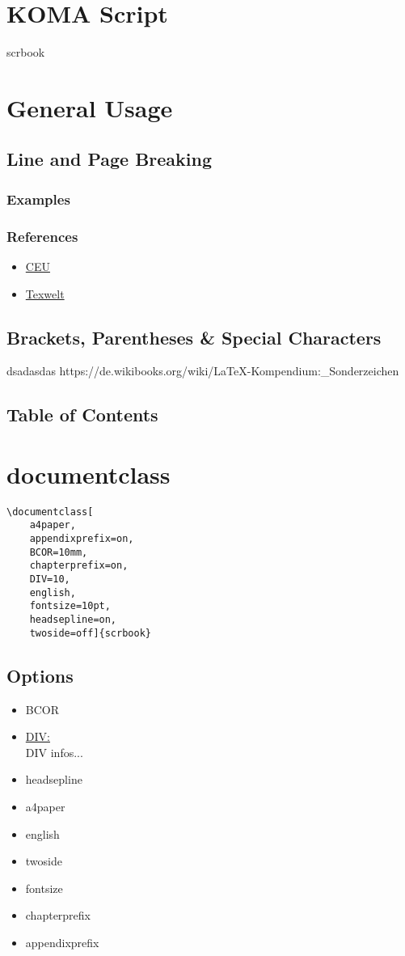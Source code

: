 \section{KOMA Script}
scrbook \autocite{KOH01}
\section{General Usage}
\subsection{Line and Page Breaking}
\subsubsection{Examples}
\subsubsection{References}
\begin{itemize}
    \item{\href{http://www.personal.ceu.hu/tex/breaking.htm} {CEU} \autocite{CEU01}}
    \item{\href{https://texwelt.de/wissen/fragen/4014/was-ist-der-unterschied-zwischen-newline-und-linebreak}{Texwelt}}
\end{itemize}


\subsection{Brackets, Parentheses \& Special Characters}
dsadasdas
https://de.wikibooks.org/wiki/LaTeX-Kompendium:\_Sonderzeichen
\subsection{Table of Contents}
\section{documentclass}
\begin{lstlisting}[style=tw-latex-sty]
\documentclass[
    a4paper,
    appendixprefix=on,
    BCOR=10mm,
    chapterprefix=on,
    DIV=10,
    english,
    fontsize=10pt,
    headsepline=on,
    twoside=off]{scrbook}
\end{lstlisting}
\subsection{Options}
\begin{itemize}
    \item{BCOR}
    \item{\href{http://mirrors.ibiblio.org/CTAN/macros/latex/contrib/koma-script/doc/scrguide.pdf\#desc:typearea.option.DIV}{DIV:}\\
        DIV infos...}
    \item{headsepline}
    \item{a4paper}
    \item{english}
    \item{twoside}
    \item{fontsize}
    \item{chapterprefix}
    \item{appendixprefix}
\end{itemize}
